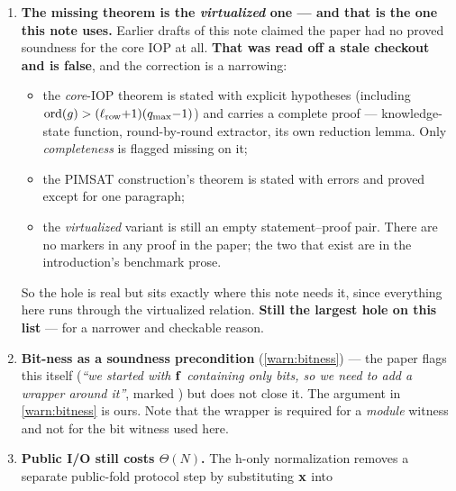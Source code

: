 \begin{enumerate}[leftmargin=1.5em,itemsep=2pt,topsep=4pt]
        $2^{s}$ exactly, and $N$ is not a parameter of  at
        all. Since every layout sets $s$ to a fixed fraction of $n$, the block is
        $\Theta(N^{2/5})$--$\Theta(N^{1/2})$.  records the
        corrected axis interpretation; the old $\ellcol=N$ argument has been
        removed.
  \item \textbf{The missing theorem is the \emph{virtualized} one --- and that is
        the one this note uses.} Earlier drafts of this note claimed the paper
        had no proved soundness for the core IOP at all. \textbf{That was read
        off a stale checkout and is false}, and the correction is a narrowing:
        \begin{itemize}[leftmargin=1.2em,itemsep=1pt,topsep=2pt]
          \item the \emph{core}-IOP theorem is stated with explicit hypotheses
                (including $\mathrm{ord}(g)>(\ell_{\mathrm{row}}{+}1)(q_{\max}{-}1)$) and carries a
                complete proof --- knowledge-state function, round-by-round
                extractor, its own reduction lemma. Only \emph{completeness} is
                flagged missing on it;
          \item the PIMSAT construction's theorem is stated with errors and
                proved except for one paragraph;
          \item the \emph{virtualized} variant is still an empty
                statement--proof pair. There are no  markers in any
                proof in the paper; the two that exist are in the introduction's
                benchmark prose.
        \end{itemize}
        So the hole is real but sits exactly where this note needs it, since
        everything here runs through the virtualized relation. \textbf{Still the
        largest hole on this list} --- for a narrower and checkable reason.
  \item \textbf{Bit-ness as a soundness precondition} (\cref{warn:bitness}) ---
        the paper flags this itself (\emph{``we started with $\mathbf{f}$ containing
        only bits, so we need to add a wrapper around it''}, marked )
        but does not close it. The argument in \cref{warn:bitness} is ours. Note
        that the wrapper is required for a \emph{module} witness and not for the
        bit witness used here.
  \item \textbf{Public I/O still costs $\Theta(N)$.}  The h-only normalization
        removes a separate public-fold protocol step by substituting $\mathbf{x}$ into

\end{enumerate}
